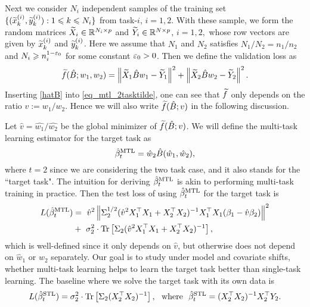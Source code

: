 Next we consider $N_i$ independent samples of the training set $\{(\widetilde x_k^{(i)},\widetilde y_k^{(i)}): 1\leqslant k \leqslant N_i\}$ from task-$i$, $i=1,2$. With these sample, we form the random matrices $\widetilde X_i \in \mathbb{R}^{N_i\times p}$ and $\widetilde Y_i\in \mathbb{R}^{N\times p}$, $i=1,2,$ whose row vectors are given by $\widetilde x_k^{(i)}$ and $\widetilde y_k^{(i)}$. Here we assume that $N_1$ and $N_2$ satisfies $N_1/N_2=n_1/n_2$ and $N_i \geqslant n_i^{1-{\varepsilon}_0}$ for some constant ${\varepsilon}_0>0$. Then we define the validation loss as
\begin{align}\label{eq_mtl_2tasktilde}
	\widetilde f(\hat B; w_1,w_2) = \left\| \widetilde X_1 \hat B w_1 - \widetilde Y_1 \right\|^2 + \left\| \widetilde X_2 \hat B w_2 - \widetilde Y_2 \right\|^2.
\end{align}
Inserting \eqref{hatB} into \eqref{eq_mtl_2tasktilde}, one can see that $\widetilde f$ only depends on the ratio $v:=w_1/w_2$. Hence we will also write $\widetilde f(\hat B; v)$ in the following discussion.

Let $\hat v=\hat{w_1}/\hat{w_2}$ be the global minimizer of $\widetilde f(\hat B; v)$. We will define the multi-task learning estimator for the target task as
	\[ \hat{\beta}_t^{\text{MTL}} = \hat{w}_{2}\hat{B}(\hat{w}_1, \hat{w}_2), \]
	where $t=2$ since we are considering the two task case, and it also stands for the ``target task". 
The intuition for deriving $\hat{\beta}_t^{\text{MTL}}$ is akin to performing multi-task training in practice.
Then the test loss of using $\hat{\beta}_t^{\text{MTL}}$ for the target task is
\begin{align}
	L(\hat{\beta}_t^{\text{MTL}}) &=~ \hat{v}^2 \left\| \Sigma_2^{1/2}(\hat{v}^2 X_1^{\top}X_1 + X_2^{\top}X_2)^{-1} X_1^{\top}X_1 (\beta_1 - \hat{v} \beta_2) \right\|^2 \nonumber \\
			&+~  \sigma_2^2 \cdot \operatorname{Tr}\left[\Sigma_2(\hat{v}^2 X_1^{\top}X_1 + X_2^{\top}X_2)^{-1} \right], \label{eq_te_mtl_2task}
\end{align}
which is well-defined since it only depends on $\hat v$, but otherwise does not depend on $\hat w_1$ or $\hat w_2$ separately. Our goal is to study under model and covariate shifts, whether multi-task learning helps to learn the target task better than single-task learning.
The baseline where we solve the target task with its own data is
\begin{align*}
	L(\hat{\beta}_t^{\STL}) = \sigma_2^2 \cdot \bigtr{\Sigma_2(X_2^{\top}X_2)^{-1}}, \ \text{ where } \ \hat{\beta}_t^{\STL} = (X_2^{\top}X_2)^{-1} X_2^{\top}Y_2.
\end{align*}

